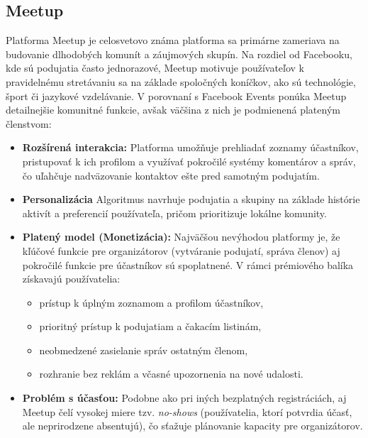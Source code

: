 \subsection{Meetup}
Platforma Meetup je celosvetovo známa platforma sa primárne zameriava na budovanie dlhodobých komunít a záujmových skupín. 
Na rozdiel od Facebooku, kde sú podujatia často jednorazové, Meetup motivuje používateľov k pravidelnému stretávaniu sa na základe spoločných koníčkov, 
ako sú technológie, šport či jazykové vzdelávanie.
V porovnaní s Facebook Events ponúka Meetup detailnejšie komunitné funkcie, avšak väčšina z nich je podmienená plateným členstvom:

\begin{itemize}[noitemsep]
    \item \textbf{Rozšírená interakcia:} Platforma umožňuje prehliadať zoznamy účastníkov, pristupovať k ich profilom a využívať pokročilé 
    systémy komentárov a správ, čo uľahčuje nadväzovanie kontaktov ešte pred samotným podujatím.
    \item \textbf{Personalizácia} Algoritmus navrhuje podujatia a skupiny na základe histórie aktivít a preferencií používateľa,
     pričom prioritizuje lokálne komunity.
    \item \textbf{Platený model (Monetizácia):} Najväčšou nevýhodou platformy je, že kľúčové funkcie pre organizátorov 
    (vytváranie podujatí, správa členov) aj pokročilé funkcie pre účastníkov sú spoplatnené. V rámci prémiového balíka získavajú používatelia:
    \begin{itemize}[noitemsep]
        \item prístup k úplným zoznamom a profilom účastníkov,
        \item prioritný prístup k podujatiam a čakacím listinám,
        \item neobmedzené zasielanie správ ostatným členom,
        \item rozhranie bez reklám a včasné upozornenia na nové udalosti.
    \end{itemize}
    \item \textbf{Problém s účasťou:} Podobne ako pri iných bezplatných registráciách, aj Meetup čelí vysokej miere tzv. \textit{no-shows} (používatelia, ktorí potvrdia účasť, ale neprirodzene absentujú), čo sťažuje plánovanie kapacity pre organizátorov.
\end{itemize}

